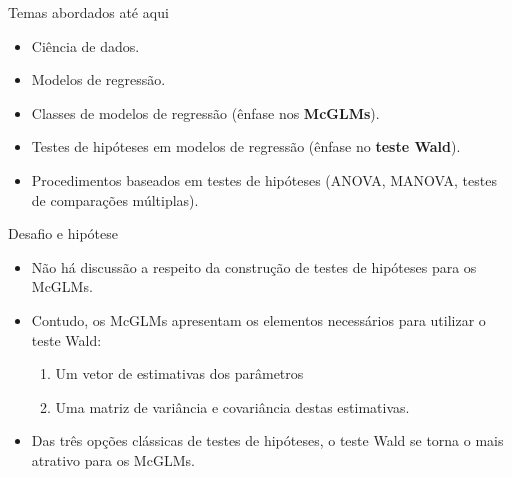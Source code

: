 \documentclass[
  ignorenonframetext,
  serif,
  professionalfont,
  usenames,
  dvipsnames,
  aspectratio = 169]{beamer}
\begin{document}
\begin{frame}{Temas abordados até aqui}
\protect\hypertarget{temas-abordados-atuxe9-aqui}{}
\begin{itemize}
  \itemsep 2ex
    
  \item Ciência de dados.

  \item Modelos de regressão.

  \item Classes de modelos de regressão (ênfase nos \textbf{McGLMs}).

  \item Testes de hipóteses em modelos de regressão (ênfase no \textbf{teste Wald}).

  \item Procedimentos baseados em testes de hipóteses (ANOVA, MANOVA, testes de comparações múltiplas).

\end{itemize}
\end{frame}

\begin{frame}{Desafio e hipótese}
\protect\hypertarget{desafio-e-hipuxf3tese}{}
\begin{itemize}
  \itemsep 2ex
    
  \item Não há discussão a respeito da construção de testes de hipóteses para os McGLMs.

  \item Contudo, os McGLMs apresentam os elementos necessários para utilizar o teste Wald:
    \begin{enumerate}
      \item Um vetor de estimativas dos parâmetros
      \item Uma matriz de variância e covariância destas estimativas.
    \end{enumerate}
    
  \item Das três opções clássicas de testes de hipóteses, o teste Wald se torna o mais atrativo para os McGLMs. 

\end{itemize}
\end{frame}
\end{document}
